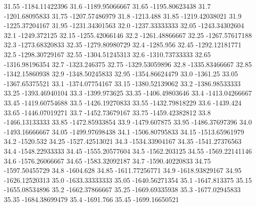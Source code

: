           31.55   -1184.11422396
           31.6   -1189.95066667
          31.65   -1195.80623438
           31.7   -1201.68095833
          31.75   -1207.57486979
           31.8        -1213.488
          31.85   -1219.42038021
           31.9   -1225.37204167
          31.95   -1231.34301563
           32.0   -1237.33333333
          32.05   -1243.34302604
           32.1     -1249.372125
          32.15   -1255.42066146
           32.2   -1261.48866667
          32.25   -1267.57617188
           32.3   -1273.68320833
          32.35   -1279.80980729
           32.4        -1285.956
          32.45   -1292.12181771
           32.5   -1298.30729167
          32.55   -1304.51245313
           32.6   -1310.73733333
          32.65   -1316.98196354
           32.7     -1323.246375
          32.75   -1329.53059896
           32.8   -1335.83466667
          32.85   -1342.15860938
           32.9   -1348.50245833
          32.95   -1354.86624479
           33.0         -1361.25
          33.05   -1367.65375521
           33.1   -1374.07754167
          33.15   -1380.52139062
           33.2   -1386.98533333
          33.25   -1393.46940104
           33.3     -1399.973625
          33.35   -1406.49803646
           33.4   -1413.04266667
          33.45   -1419.60754688
           33.5   -1426.19270833
          33.55   -1432.79818229
           33.6        -1439.424
          33.65   -1446.07019271
           33.7   -1452.73679167
          33.75   -1459.42382812
           33.8   -1466.13133333
          33.85   -1472.85933854
           33.9     -1479.607875
          33.95   -1486.37697396
           34.0   -1493.16666667
          34.05   -1499.97698438
           34.1   -1506.80795833
          34.15   -1513.65961979
           34.2        -1520.532
          34.25   -1527.42513021
           34.3   -1534.33904167
          34.35   -1541.27376563
           34.4   -1548.22933333
          34.45   -1555.20577604
           34.5     -1562.203125
          34.55   -1569.22141146
           34.6   -1576.26066667
          34.65   -1583.32092187
           34.7   -1590.40220833
          34.75   -1597.50455729
           34.8        -1604.628
          34.85   -1611.77256771
           34.9   -1618.93829167
          34.95   -1626.12520313
           35.0   -1633.33333333
          35.05   -1640.56271354
           35.1     -1647.813375
          35.15   -1655.08534896
           35.2   -1662.37866667
          35.25   -1669.69335938
           35.3   -1677.02945833
          35.35   -1684.38699479
           35.4        -1691.766
          35.45   -1699.16650521
